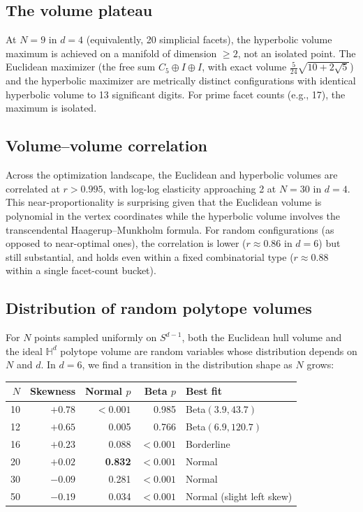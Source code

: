 \documentclass[11pt]{article}
\begin{document}
\subsection{The volume plateau}
At $N = 9$ in $d = 4$ (equivalently, 20 simplicial facets), the
hyperbolic volume maximum is achieved on a manifold of dimension $\geq 2$,
not an isolated point. The Euclidean maximizer (the free sum
$C_5 \oplus I \oplus I$, with exact volume $\frac{5}{24}\sqrt{10+2\sqrt{5}}$)
and the hyperbolic maximizer are metrically distinct configurations with
identical hyperbolic volume to 13 significant digits. For prime facet
counts (e.g., 17), the maximum is isolated.

\subsection{Volume--volume correlation}
Across the optimization landscape, the Euclidean and hyperbolic volumes
are correlated at $r > 0.995$, with log-log elasticity approaching 2
at $N = 30$ in $d = 4$. This near-proportionality is surprising given
that the Euclidean volume is polynomial in the vertex coordinates while
the hyperbolic volume involves the transcendental Haagerup--Munkholm formula.
For random configurations (as opposed to near-optimal ones), the correlation
is lower ($r \approx 0.86$ in $d = 6$) but still substantial, and holds
even within a fixed combinatorial type ($r \approx 0.88$ within a single
facet-count bucket).

\subsection{Distribution of random polytope volumes}

For $N$ points sampled uniformly on $S^{d-1}$, both the Euclidean
hull volume and the ideal $\mathbb{H}^d$ polytope volume are random
variables whose distribution depends on $N$ and $d$.
In $d = 6$, we find a transition in the distribution shape as $N$ grows:

\begin{center}
\begin{tabular}{r r r r l}
\toprule
$N$ & Skewness & Normal $p$ & Beta $p$ & Best fit \\
\midrule
10 & $+0.78$ & $<0.001$ & 0.985 & Beta$(3.9, 43.7)$ \\
12 & $+0.65$ & 0.005 & 0.766 & Beta$(6.9, 120.7)$ \\
16 & $+0.23$ & 0.088 & $<0.001$ & Borderline \\
20 & $+0.02$ & \textbf{0.832} & $<0.001$ & Normal \\
30 & $-0.09$ & 0.281 & $<0.001$ & Normal \\
50 & $-0.19$ & 0.034 & $<0.001$ & Normal (slight left skew) \\
\bottomrule
\end{tabular}
\end{center}
\end{document}
